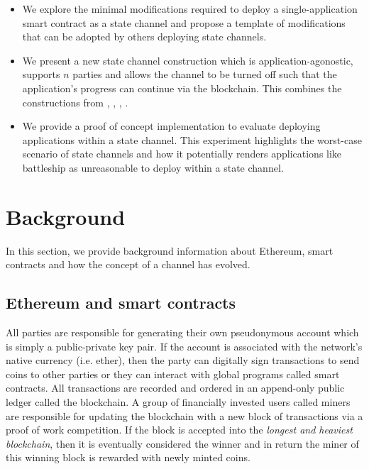 \documentclass{llncs}
\begin{document}
\begin{itemize}
\item We explore the minimal modifications required to deploy a single-application smart contract as a state channel and propose a template of modifications that can be adopted by others deploying state channels. 
\item We present a new state channel construction which is application-agonostic, supports $n$ parties and allows the channel to be turned off such that the application's progress can continue via the blockchain. This combines the constructions from \cite{miller2017sprites}, \cite{mccorry2018pisa}, \cite{dziembowski2017perun}, \cite{croman2016scaling}. 
\item We provide a proof of concept implementation to evaluate deploying applications within a state channel.
This experiment highlights the worst-case scenario of state channels and how it potentially renders applications like battleship as unreasonable to deploy within a state channel. 
\end{itemize}

\section{Background}

In this section, we provide background information about Ethereum, smart contracts and how the concept of a channel has evolved. 

\subsection{Ethereum and smart contracts}

All parties are responsible for generating their own pseudonymous account which is simply a public-private key pair. 
If the account is associated with the network's native currency (i.e. ether), then the party can digitally sign transactions to send coins to other parties or they can interact with global programs called smart contracts. 
All transactions are recorded and ordered in an append-only public ledger called the blockchain.
A group of financially invested users called miners are responsible for updating the blockchain with a new block of transactions via a proof of work competition. 
If the block is accepted into the \textit{longest and heaviest blockchain}, then it is eventually considered the winner and in return the miner of this winning block is rewarded with newly minted coins. 
\end{document}

